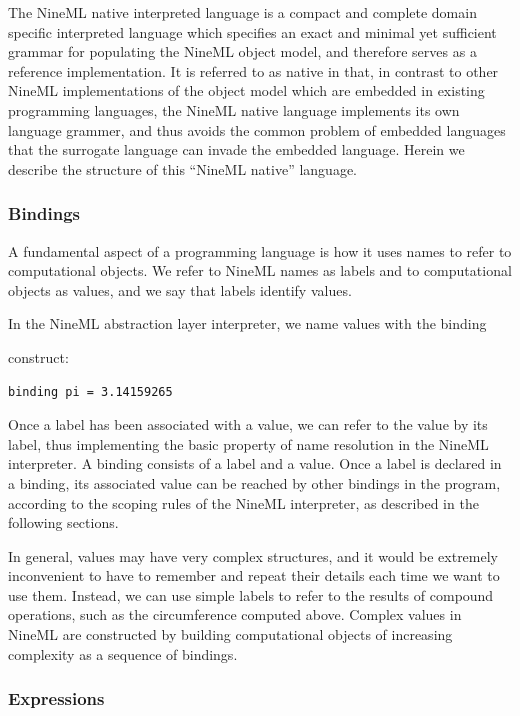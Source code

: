 \documentclass[a4paper]{article}
\begin{document}
The NineML native interpreted language is a compact and complete
domain specific interpreted language which specifies an exact and
minimal yet sufficient grammar for populating the NineML object model,
and therefore serves as a reference implementation.  It is referred to
as native in that, in contrast to other NineML implementations of
the object model which are embedded in existing programming languages,
the NineML native language implements its own language grammer, and
thus avoids the common problem of embedded languages that the
surrogate language can invade the embedded language.  Herein we
describe the structure of this ``NineML native'' language.

\subsubsection{Bindings}

A fundamental aspect of a programming language is how it uses names to
refer to computational objects.  We refer to NineML names as labels
and to computational objects as values, and we say that labels
identify values.

In the NineML abstraction layer interpreter, we name values with the binding

construct:
\begin{lstlisting}[style=display]
binding pi = 3.14159265
\end{lstlisting}

Once a label has been associated with a value, we can refer to the
value by its label, thus implementing the basic property of name
resolution in the NineML interpreter. A binding consists of a label
and a value. Once a label is declared in a binding, its associated
value can be reached by other bindings in the program, according to
the scoping rules of the NineML interpreter, as described in the
following sections.

In general, values may have very complex structures, and it would be
extremely inconvenient to have to remember and repeat their details
each time we want to use them. Instead, we can use simple labels to
refer to the results of compound operations, such as the circumference
computed above. Complex values in NineML are constructed by building
computational objects of increasing complexity as a sequence of
bindings.

 
\subsubsection{Expressions}
\end{document}
